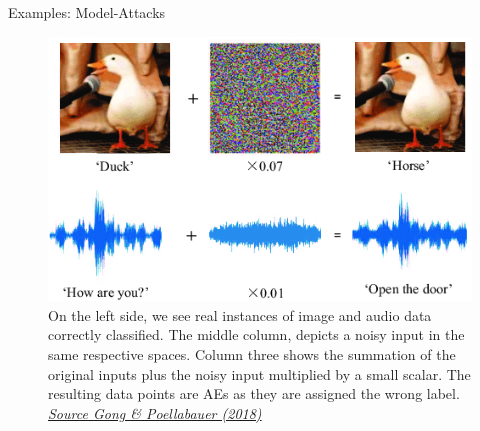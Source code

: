 \documentclass[11pt,compress,t,notes=noshow, xcolor=table]{beamer}
\begin{document}
\begin{vbframe}{Examples: Model-Attacks}
\begin{figure}[h]
\centering
  \includegraphics[width=0.6\linewidth]{figure/AEduckSound.png}
  \caption{On the left side, we see real instances of image and audio data  correctly classified. The middle column, depicts a noisy input in the same respective spaces. Column three shows the summation of the original inputs plus the noisy input multiplied by a small scalar. The resulting data points are AEs as they are assigned the wrong label. \href{https://arxiv.org/pdf/1803.09156.pdf}{\textit{Source Gong \& Poellabauer (2018)}}}
  \label{fig:mnist}
\end{figure} 


\end{vbframe}
\end{document}
